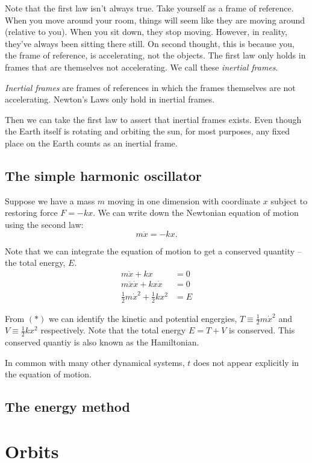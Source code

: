 \documentclass[a4paper]{article}
\begin{document}
Note that the first law isn't always true. Take yourself as a frame of reference. When you move around your room, things will seem like they are moving around (relative to you). When you sit down, they stop moving. However, in reality, they've always been sitting there still. On second thought, this is because you, the frame of reference, is accelerating, not the objects. The first law only holds in frames that are themselves not accelerating. We call these \emph{inertial frames}.
\begin{defi}
  \emph{Inertial frames} are frames of references in which the frames themselves are not accelerating. Newton's Laws only hold in inertial frames.
\end{defi}
Then we can take the first law to assert that inertial frames exists. Even though the Earth itself is rotating and orbiting the sun, for most purposes, any fixed place on the Earth counts as an inertial frame.

\subsection{The simple harmonic oscillator}
Suppose we have a mass $m$ moving in one dimension with coordinate $x$ subject to restoring force $F = -kx$. We can write down the Newtonian equation of motion using the second law:
$$m\ddot{x} = -kx.$$

Note that we can integrate the equation of motion to get a conserved quantity -- the total energy, $E$.
\begin{align*}
  m\ddot{x} + kx &= 0 \\
  m\ddot{x}\dot{x} + kx\dot{x} &= 0 \\
  \frac{1}{2} m\dot{x}^2 + \frac{1}{2} kx^2 &= E \tag{$*$}
\end{align*}

From $(*)$ we can identify the kinetic and potential engergies, $T \equiv  \frac{1}{2} m\dot{x}^2$ and $V \equiv \frac{1}{2} kx^2$ respectively. Note that the total energy $E = T + V$ is conserved. This conserved quantiy is also known as the Hamiltonian.

In common with many other dynamical systems, $t$ does not appear explicitly in the equation of motion.

\subsection{The energy method}


\section{Orbits}
\end{document}
